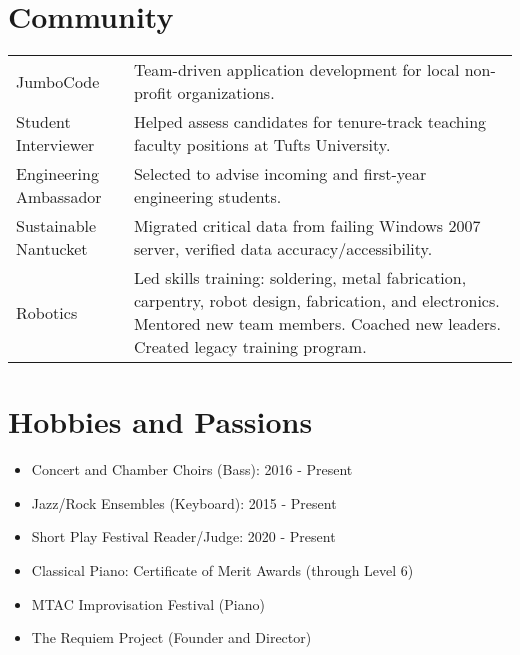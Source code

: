 \documentclass[letter,10pt]{article}
\begin{document}
\section{Community}
\begin{tabularx}{\linewidth}{@{}l X@{}}	
    JumboCode & Team-driven application development for local non-profit organizations. \\[2.75pt]
    Student Interviewer & Helped assess candidates for tenure-track teaching faculty positions at Tufts University. \\[2.75pt]
    Engineering Ambassador & Selected to advise incoming and first-year engineering students. \\[2.75pt]
    Sustainable Nantucket & Migrated critical data from failing Windows 2007 server, verified data accuracy/accessibility. \\[2.75pt]
    Robotics & Led skills training: soldering, metal fabrication, carpentry, robot design, fabrication, and electronics. Mentored new team members. Coached new leaders. Created legacy training program.
\end{tabularx}

\section{Hobbies and Passions}
\begin{itemize}
    \item Concert and Chamber Choirs (Bass): 2016 - Present
    \item Jazz/Rock Ensembles (Keyboard): 2015 - Present
    \item Short Play Festival Reader/Judge: 2020 - Present
    \item Classical Piano: Certificate of Merit Awards (through Level 6)
    \item MTAC Improvisation Festival (Piano)
    \item The Requiem Project (Founder and Director)
\end{itemize}



\end{document}
